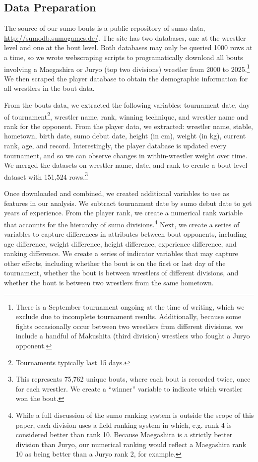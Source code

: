 \documentclass[12pt]{article}
\begin{document}
\subsection{Data Preparation}
The source of our sumo bouts is a public repository of sumo data, \url{http://sumodb.sumogames.de/}. The site has two databases, one at the wrestler level and one at the bout level. Both databases may only be queried 1000 rows at a time, so we wrote webscraping scripts to programatically download all bouts involving a Maegashira or Juryo (top two divisions) wrestler from 2000 to 2025.\footnote{There is a September tournament ongoing at the time of writing, which we exclude due to incomplete tournament results. Additionally, because some fights occasionally occur between two wrestlers from different divisions, we include a handful of Makushita (third division) wrestlers who fought a Juryo opponent.} We then scraped the player database to obtain the demographic information for all wrestlers in the bout data.

From the bouts data, we extracted the following variables: tournament date, day of tournament\footnote{Tournaments typically last 15 days.}, wrestler name, rank, winning technique, and wrestler name and rank for the opponent. From the player data, we extracted: wrestler name, stable, hometown, birth date, sumo debut date, height (in cm), weight (in kg), current rank, age, and record. Interestingly, the player database is updated every tournament, and so we can observe changes in within-wrestler weight over time. We merged the datasets on wrestler name, date, and rank to create a bout-level dataset with 151,524 rows.\footnote{This represents 75,762 unique bouts, where each bout is recorded twice, once for each wrestler. We create a ``winner'' variable to indicate which wrestler won the bout.}

Once downloaded and combined, we created additional variables to use as features in our analysis. We subtract tournament date by sumo debut date to get years of experience. From the player rank, we create a numerical rank variable that accounts for the hierarchy of sumo divisions.\footnote{While a full discussion of the sumo ranking system is outside the scope of this paper, each division uses a field ranking system in which, e.g. rank 4 is considered better than rank 10. Because Maegashira is a strictly better division than Juryo, our numerical ranking would reflect a Maegashira rank 10 as being better than a Juryo rank 2, for example.} Next, we create a series of variables to capture differences in attributes between bout opponents, including age difference, weight difference, height difference, experience difference, and ranking difference. We create a series of indicator variables that may capture other effects, including whether the bout is on the first or last day of the tournament, whether the bout is between wrestlers of different divisions, and whether the bout is between two wrestlers from the same hometown. 
\end{document}
